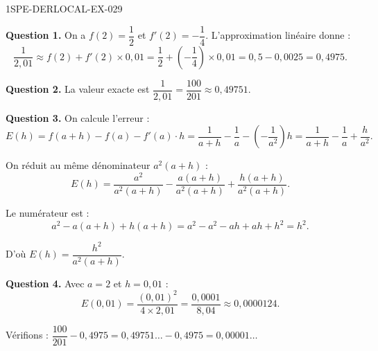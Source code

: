 \begin{corrige}{1SPE-DERLOCAL-EX-029}

\textbf{Question 1.} On a $f(2) = \dfrac{1}{2}$ et $f'(2) = -\dfrac{1}{4}$. L'approximation linéaire donne :
\[
\dfrac{1}{2{,}01} \approx f(2) + f'(2) \times 0{,}01 = \dfrac{1}{2} + \left(-\dfrac{1}{4}\right) \times 0{,}01 = 0{,}5 - 0{,}0025 = \boxed{0{,}4975}.
\]

\textbf{Question 2.} La valeur exacte est $\dfrac{1}{2{,}01} = \dfrac{100}{201} \approx 0{,}49751$.

\textbf{Question 3.} On calcule l'erreur :
\[
E(h) = f(a+h) - f(a) - f'(a) \cdot h = \dfrac{1}{a+h} - \dfrac{1}{a} - \left(-\dfrac{1}{a^2}\right)h = \dfrac{1}{a+h} - \dfrac{1}{a} + \dfrac{h}{a^2}.
\]

On réduit au même dénominateur $a^2(a+h)$ :
\[
E(h) = \dfrac{a^2}{a^2(a+h)} - \dfrac{a(a+h)}{a^2(a+h)} + \dfrac{h(a+h)}{a^2(a+h)}.
\]

Le numérateur est :
\[
a^2 - a(a+h) + h(a+h) = a^2 - a^2 - ah + ah + h^2 = h^2.
\]

D'où $\boxed{E(h) = \dfrac{h^2}{a^2(a+h)}}$.

\textbf{Question 4.} Avec $a = 2$ et $h = 0{,}01$ :
\[
E(0{,}01) = \dfrac{(0{,}01)^2}{4 \times 2{,}01} = \dfrac{0{,}0001}{8{,}04} \approx 0{,}0000124.
\]

Vérifions : $\dfrac{100}{201} - 0{,}4975 = 0{,}49751\ldots - 0{,}4975 = 0{,}00001\ldots$ \checkmark

\end{corrige}
